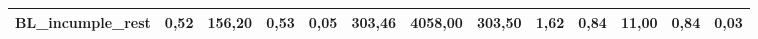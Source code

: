 \documentclass[12pt, spanish]{article}
\begin{document}
\begin{table}[H]
\begin{adjustwidth}{-2cm}{-2cm}
\begin{tabular}{|l|c|c|c|c|c|c|c|c|c|c|c|c|}
BL\_incumple\_rest                                      & 0,52                         & 156,20                         & 0,53                      & 0,05                   & 303,46                       & 4058,00                        & 303,50                    & 1,62                   & 0,84                         & 11,00                          & 0,84                      & 0,03                  \\ \hline
\end{tabular}

\end{adjustwidth}
\end{table}


\begin{table}[H]
\small
\begin{adjustwidth}{-1.9cm}{-1.9cm}%



\end{adjustwidth}
\end{table}
\end{document}
